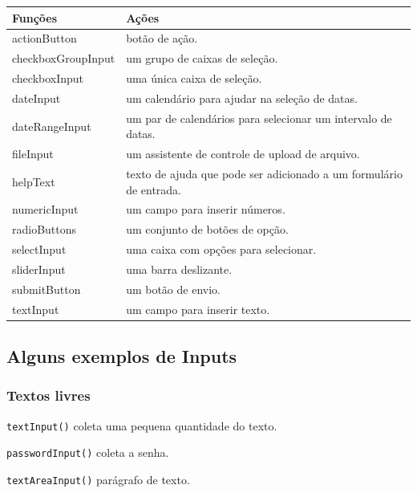 \documentclass[
]{book}
\begin{document}
\begin{longtable}[]{@{}
  >{\raggedright\arraybackslash}p{}
  >{\raggedright\arraybackslash}p{}@{}}
\toprule
Funções & Ações \\
\midrule
\endhead
actionButton & botão de ação. \\
checkboxGroupInput & um grupo de caixas de seleção. \\
checkboxInput & uma única caixa de seleção. \\
dateInput & um calendário para ajudar na seleção de datas. \\
dateRangeInput & um par de calendários para selecionar um intervalo de datas. \\
fileInput & um assistente de controle de upload de arquivo. \\
helpText & texto de ajuda que pode ser adicionado a um formulário de entrada. \\
numericInput & um campo para inserir números. \\
radioButtons & um conjunto de botões de opção. \\
selectInput & uma caixa com opções para selecionar. \\
sliderInput & uma barra deslizante. \\
submitButton & um botão de envio. \\
textInput & um campo para inserir texto. \\
\bottomrule
\end{longtable}

\hypertarget{alguns-exemplos-de-inputs}{%
\subsection{\texorpdfstring{\textbf{Alguns exemplos de Inputs}}{Alguns exemplos de Inputs}}\label{alguns-exemplos-de-inputs}}

\hypertarget{textos-livres}{%
\subsubsection{\texorpdfstring{\textbf{Textos livres}}{Textos livres}}\label{textos-livres}}

\texttt{textInput()} coleta uma pequena quantidade do texto.

\texttt{passwordInput()} coleta a senha.

\texttt{textAreaInput()} parágrafo de texto.
\end{document}
